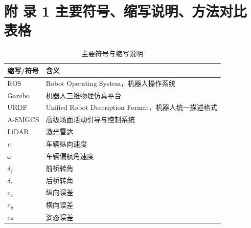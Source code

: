 
\section*{附 录 1 主要符号、缩写说明、方法对比表格}

\begin{table}[htbp]
\centering
\caption*{主要符号与缩写说明}
\renewcommand{\arraystretch}{1.25}
\begin{tabularx}{\textwidth}{>{\centering\arraybackslash}p{3cm}X}
\toprule
缩写/符号 & 含义\\
\midrule
ROS & Robot Operating System，机器人操作系统\\
Gazebo & 机器人三维物理仿真平台\\
URDF & Unified Robot Description Format，机器人统一描述格式\\
A-SMGCS & 高级场面活动引导与控制系统\\
LiDAR & 激光雷达\\
$v$ & 车辆纵向速度\\
$\omega$ & 车辆偏航角速度\\
$\delta_f$ & 前桥转角\\
$\delta_r$ & 后桥转角\\
$e_x$ & 纵向误差\\
$e_y$ & 横向误差\\
$e_\theta$ & 姿态误差\\
\bottomrule
\end{tabularx}
\end{table}

